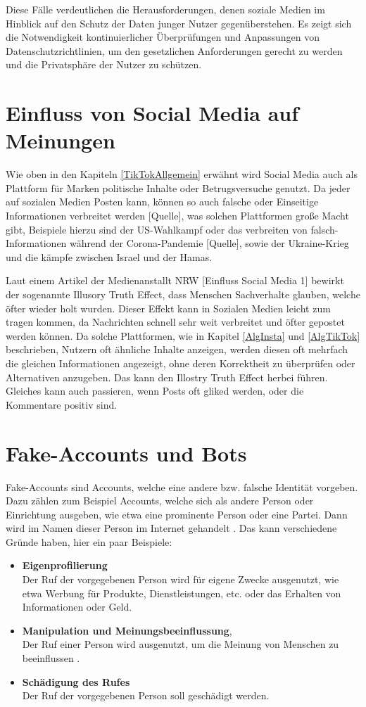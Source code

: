 \documentclass[12pt]{report}
\begin{document}
Diese Fälle verdeutlichen die Herausforderungen, denen soziale Medien im Hinblick auf den Schutz der Daten junger Nutzer gegenüberstehen. Es zeigt sich die Notwendigkeit kontinuierlicher Überprüfungen und Anpassungen von Datenschutzrichtlinien, um den gesetzlichen Anforderungen gerecht zu werden und die Privatsphäre der Nutzer zu schützen.


\section{Einfluss von Social Media auf Meinungen}
Wie oben in den Kapiteln \ref{TikTokAllgemein} erwähnt wird Social Media auch als Plattform für Marken politische Inhalte oder Betrugsversuche genutzt. Da jeder auf sozialen Medien Posten kann, können so auch falsche oder Einseitige Informationen verbreitet werden [Quelle], was solchen Plattformen große Macht gibt, Beispiele hierzu sind der US-Wahlkampf oder das verbreiten von falsch-Informationen während der Corona-Pandemie [Quelle], sowie der Ukraine-Krieg und die kämpfe zwischen Israel und der Hamas.
\newline 

Laut einem Artikel der Medienanstallt NRW [Einfluss Social Media 1] bewirkt der sogenannte Illusory Truth Effect, dass Menschen Sachverhalte glauben, welche öfter wieder holt wurden. Dieser Effekt kann in Sozialen Medien leicht zum tragen kommen, da Nachrichten schnell sehr weit verbreitet und öfter gepostet werden können. Da solche Plattformen, wie in Kapitel \ref{AlgInsta} und \ref{AlgTikTok} beschrieben, Nutzern oft ähnliche Inhalte anzeigen, werden diesen oft mehrfach die gleichen Informationen angezeigt, ohne deren Korrektheit zu überprüfen oder Alternativen anzugeben. Das kann den Illostry Truth Effect herbei führen. Gleiches kann auch passieren, wenn Posts oft gliked werden, oder die Kommentare positiv sind. 

\section{Fake-Accounts und Bots}
Fake-Accounts sind Accounts, welche eine andere bzw. falsche Identität vorgeben. Dazu zählen zum Beispiel Accounts, welche sich als andere Person oder Einrichtung ausgeben, wie etwa eine prominente Person oder eine Partei. Dann wird im Namen dieser Person im Internet gehandelt \cite{akhtar2023false}. Das kann verschiedene Gründe haben, hier ein paar Beispiele:
\begin{itemize}
	\item \textbf{Eigenprofilierung }\\
	Der Ruf der vorgegebenen Person wird für eigene Zwecke ausgenutzt, wie etwa Werbung für Produkte, Dienstleistungen, etc. oder das Erhalten von Informationen oder Geld.
	\item \textbf{Manipulation und Meinungsbeeinflussung},\\
	Der Ruf einer Person wird ausgenutzt, um die Meinung von Menschen zu beeinflussen \cite{reuters2025merz}.
	\item \textbf{Schädigung des Rufes}\\
	Der Ruf der vorgegebenen Person soll geschädigt werden.
\end{itemize}
\end{document}
